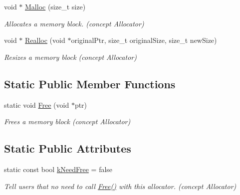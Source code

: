 \begin{DoxyCompactItemize}
\mbox{\label{class_memory_pool_allocator_a02f6832910453446cb77bf919ba49e99}} 
void $\ast$ \hyperlink{class_memory_pool_allocator_a02f6832910453446cb77bf919ba49e99}{Malloc} (size\+\_\+t size)
\begin{DoxyCompactList}\small\item\em Allocates a memory block. (concept Allocator) \end{DoxyCompactList}\item 
\mbox{\label{class_memory_pool_allocator_aba75280d42184b0ad414243f7f5ac6c7}} 
void $\ast$ \hyperlink{class_memory_pool_allocator_aba75280d42184b0ad414243f7f5ac6c7}{Realloc} (void $\ast$original\+Ptr, size\+\_\+t original\+Size, size\+\_\+t new\+Size)
\begin{DoxyCompactList}\small\item\em Resizes a memory block (concept Allocator) \end{DoxyCompactList}\end{DoxyCompactItemize}
\subsection*{Static Public Member Functions}
\begin{DoxyCompactItemize}
\item 
\mbox{\label{class_memory_pool_allocator_a6b180eb150451b4df8b70d827cd1191c}} 
static void \hyperlink{class_memory_pool_allocator_a6b180eb150451b4df8b70d827cd1191c}{Free} (void $\ast$ptr)
\begin{DoxyCompactList}\small\item\em Frees a memory block (concept Allocator) \end{DoxyCompactList}\end{DoxyCompactItemize}
\subsection*{Static Public Attributes}
\begin{DoxyCompactItemize}
\item 
\mbox{\label{class_memory_pool_allocator_ab4c7c5c631e451689bc9da392a65194f}} 
static const bool \hyperlink{class_memory_pool_allocator_ab4c7c5c631e451689bc9da392a65194f}{k\+Need\+Free} = false
\begin{DoxyCompactList}\small\item\em Tell users that no need to call \hyperlink{class_memory_pool_allocator_a6b180eb150451b4df8b70d827cd1191c}{Free()} with this allocator. (concept Allocator) \end{DoxyCompactList}\end{DoxyCompactItemize}


